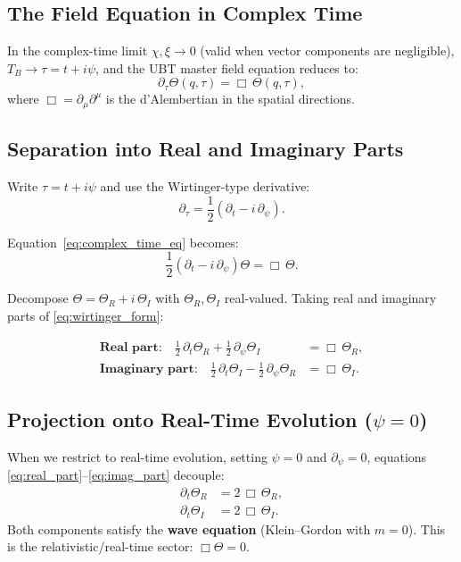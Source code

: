 \documentclass[12pt]{article}
\theoremstyle{definition}
\theoremstyle{remark}
\begin{document}
\subsection{The Field Equation in Complex Time}

In the complex-time limit $\chi, \xi \to 0$ (valid when vector components are negligible),
$T_B \to \tau = t + i\psi$, and the UBT master field equation reduces to:
\begin{equation}
  \partial_\tau \Theta(q, \tau) = \Box\,\Theta(q, \tau),
  \label{eq:complex_time_eq}
\end{equation}
where $\Box = \partial_\mu \partial^\mu$ is the d'Alembertian in the spatial directions.

\subsection{Separation into Real and Imaginary Parts}

Write $\tau = t + i\psi$ and use the Wirtinger-type derivative:
\begin{equation}
  \partial_\tau = \frac{1}{2}\left(\partial_t - i\,\partial_\psi\right).
\end{equation}

Equation~\eqref{eq:complex_time_eq} becomes:
\begin{equation}
  \frac{1}{2}\left(\partial_t - i\,\partial_\psi\right)\Theta = \Box\,\Theta.
  \label{eq:wirtinger_form}
\end{equation}

Decompose $\Theta = \Theta_R + i\,\Theta_I$ with $\Theta_R, \Theta_I$ real-valued.
Taking real and imaginary parts of \eqref{eq:wirtinger_form}:

\begin{align}
  \textbf{Real part:} \quad
  \frac{1}{2}\,\partial_t \Theta_R + \frac{1}{2}\,\partial_\psi \Theta_I
  &= \Box\,\Theta_R,
  \label{eq:real_part}\\
  \textbf{Imaginary part:} \quad
  \frac{1}{2}\,\partial_t \Theta_I - \frac{1}{2}\,\partial_\psi \Theta_R
  &= \Box\,\Theta_I.
  \label{eq:imag_part}
\end{align}

\subsection{Projection onto Real-Time Evolution ($\psi = 0$)}

When we restrict to real-time evolution, setting $\psi = 0$ and $\partial_\psi = 0$, equations
\eqref{eq:real_part}--\eqref{eq:imag_part} decouple:
\begin{align}
  \partial_t \Theta_R &= 2\,\Box\,\Theta_R, \label{eq:wave_R}\\
  \partial_t \Theta_I &= 2\,\Box\,\Theta_I. \label{eq:wave_I}
\end{align}
Both components satisfy the \textbf{wave equation} (Klein--Gordon with $m=0$).
This is the relativistic/real-time sector: $\Box\Theta = 0$.
\end{document}
